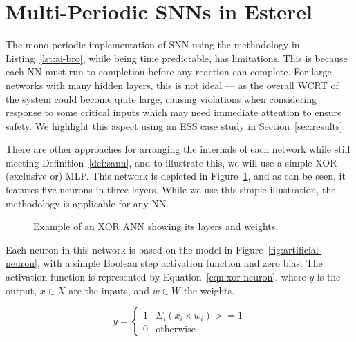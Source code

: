 \section{Multi-Periodic \acp{SNN} in Esterel}
\label{sec:esterel-mapping}

The mono-periodic implementation of \ac{SNN} using the methodology in Listing~\ref{lst:ai-bro}, while being time predictable, has limitations.
This is because each \ac{NN} must run to completion before any reaction can complete. 
For large networks with many hidden layers, this is not ideal --- as
the overall \ac{WCRT} of the system could become quite large, causing
violations when considering response to some critical inputs which may
need immediate attention to ensure safety. We highlight this aspect
using an \acf{ESS} case study in Section~\ref{sec:results}.

There are other approaches for arranging the internals of each network while still meeting Definition~\ref{def:sann}, and to illustrate this, we will use a simple XOR (exclusive or) \ac{MLP}.
This network is depicted in Figure~\ref{fig:xor-ann}, and as can be seen, it features five neurons in three layers. While we use this simple illustration, the 
methodology is applicable for any \ac{NN}.

\begin{figure}[H]
	\centering
	\scalebox{0.8}{}
	\caption{Example of an XOR \ac{ANN} showing its layers and weights.	\label{fig:xor-ann}}
\end{figure}

Each neuron in this network is based on the model in Figure~\ref{fig:artificial-neuron}, with a simple Boolean step activation function and zero bias. 
The activation function is represented by Equation~\ref{eqn:xor-neuron}, where $y$ is the output, $x \in X$ are the inputs, and $w \in W$ the weights.

\begin{equation}
y =
\begin{cases}
1 & \text{$\Sigma_{i} \left(x_i \times w_i\right) >= 1$} \\
0 & \text{otherwise}
\end{cases}
\label{eqn:xor-neuron}
\end{equation}

